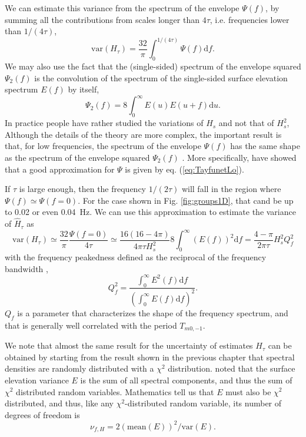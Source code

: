 {We can estimate this variance from the spectrum of the envelope $\Psi (f)$, by summing all the contributions from scales longer than $4 \tau$, i.e. frequencies lower than $1/(4 \tau)$, 
\begin{equation}
   \mathrm{var}(H_\tau) = \frac{32}{\pi} \int_0^{1/(4 \tau)} \Psi (f) {\mathrm d} f.
   \label{eq:relation_Hs_eta}
\end{equation}
We may also use the fact that the (single-sided) spectrum of the envelope squared  $\Psi_2(f)$ is the convolution of the spectrum of the single-sided
surface elevation spectrum $E(f)$ by itself,
\begin{equation}
    \Psi_{2}(f) = 8 \int_0^\infty E(u)E(u+f)\mathrm{d}u. 
\label{eq:psi2_1sided}
\end{equation}
 In practice people have rather studied the variations of $H_s$ and not that of $H_s^2$, 
 Although the details of the theory are more complex, the important result is that, for low frequencies, the spectrum of the envelope $\Psi(f)$ has the same shape as the spectrum of the envelope squared $\Psi_2(f)$ \citep{Rice1944}. More specifically, \cite{Tayfun&Lo1989} have showed that a good approximation for $\Psi$ is given by eq. (\ref{eq:TayfunetLo}). 

If $\tau$ is large enough, then the frequency $1/(2 \tau)$ will fall in the region where $\Psi(f) \simeq \Psi(f=0)$. For the case shown in Fig. \ref{fig:groups1D}, that cand be up to 0.02 or even 0.04~Hz. We can use this approximation to estimate the  variance of $\widehat{H}_\tau$ as
\begin{equation}
   \mathrm{var}(H_\tau)\simeq \frac{32}{\pi} \frac{\Psi (f=0)}{4 \tau} \simeq \frac{16(16 - 4 \pi) }{4 \pi \tau H_s^2} 8 \int_0^\infty (E(f))^2 {\mathrm d}f =  \frac{4 -  \pi }{ 2 \pi  \tau }  H_s^2 Q_f^2 
   \label{eq:groups_var_1D}
\end{equation}
with the frequency peakedness defined as the reciprocal of the frequency bandwidth \citep{Saulnier&al.2012}, 
\begin{equation} 
   Q_f^2 = \frac{  \int_{0}^\infty E^2(f)\mathrm{d}f}{\left(\int_{0}^\infty E(f)\mathrm{d}f\right)^2}. \label{eq:Qf}
\end{equation}
$Q_f$ is a parameter that characterizes the shape of the frequency spectrum, and that is generally well correlated with the period $T_{m0,-1}$. 

We note that almost the same result for the uncertainty of estimates $H_\tau$ can be obtained by starting from the result shown in the previous chapter that  
spectral densities are randomly distributed with a $\chi^2$ distribution. \cite{Young1986} noted that the surface elevation variance $E$ is the sum of all spectral components, and thus the sum of $\chi^2$ distributed random variables. Mathematics tell us that $E$ must also be $\chi^2$ distributed, and thus, like any $\chi^2$-distributed random variable, its number of degrees of freedom is 
\begin{equation}
\nu_{f,H}=2 (\mathrm{mean}(E))^2/\mathrm{var}(E).\label{eq:nu_from_ratio}
\end{equation} 

}
